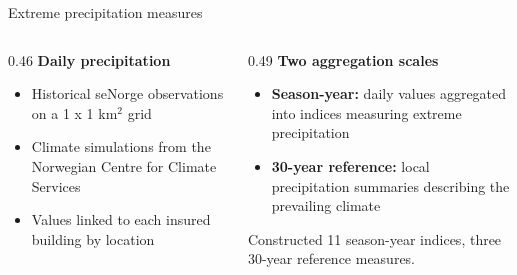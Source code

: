 \begin{frame}{Extreme precipitation measures}
  \vspace{0.5cm}
  \begin{columns}[T,onlytextwidth]
    \begin{column}{0.46\textwidth}
      \textbf{Daily precipitation}
      \begin{itemize}
        \item Historical seNorge observations on a 1 x 1 km$^2$
          grid
        \item Climate simulations from the Norwegian Centre for Climate
          Services
        \item Values linked to each insured building by location
      \end{itemize}
    \end{column}
    \begin{column}{0.49\textwidth}
      \textbf{Two aggregation scales}
      \begin{itemize}
        \item \textbf{Season-year:} daily values aggregated into indices
          measuring extreme precipitation
        \item \textbf{30-year reference:} local precipitation summaries
          describing the prevailing climate
      \end{itemize}

      \vspace{0.15cm}
      \footnotesize
      Constructed 11 season-year indices, three 30-year reference measures.
    \end{column}
  \end{columns}
\end{frame}

